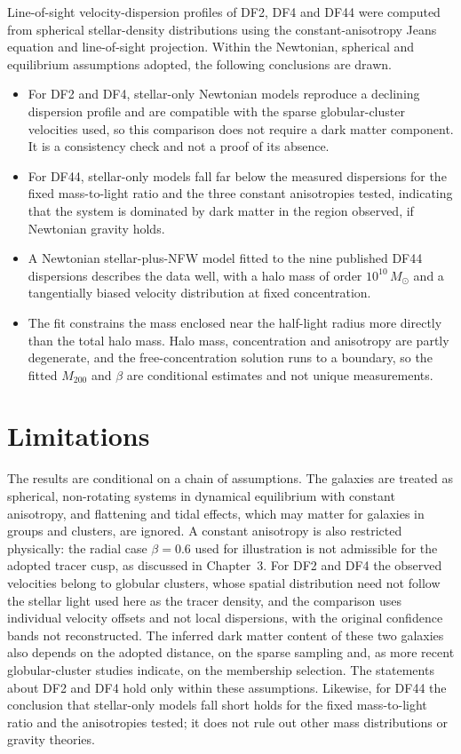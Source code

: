 \documentclass[12pt,a4paper]{report}
\numberwithin{equation}{chapter}
\begin{document}
Line-of-sight velocity-dispersion profiles of DF2, DF4 and DF44 were computed from spherical stellar-density distributions using the constant-anisotropy Jeans equation and line-of-sight projection. Within the Newtonian, spherical and equilibrium assumptions adopted, the following conclusions are drawn.
\begin{itemize}[leftmargin=1.5em,itemsep=2pt]
 \item For DF2 and DF4, stellar-only Newtonian models reproduce a declining dispersion profile and are compatible with the sparse globular-cluster velocities used, so this comparison does not require a dark matter component. It is a consistency check and not a proof of its absence.
 \item For DF44, stellar-only models fall far below the measured dispersions for the fixed mass-to-light ratio and the three constant anisotropies tested, indicating that the system is dominated by dark matter in the region observed, if Newtonian gravity holds.
 \item A Newtonian stellar-plus-NFW model fitted to the nine published DF44 dispersions describes the data well, with a halo mass of order $10^{10}\,M_\odot$ and a tangentially biased velocity distribution at fixed concentration.
 \item The fit constrains the mass enclosed near the half-light radius more directly than the total halo mass. Halo mass, concentration and anisotropy are partly degenerate, and the free-concentration solution runs to a boundary, so the fitted $M_{200}$ and $\beta$ are conditional estimates and not unique measurements.
\end{itemize}

\section{Limitations}

The results are conditional on a chain of assumptions. The galaxies are treated as spherical, non-rotating systems in dynamical equilibrium with constant anisotropy, and flattening and tidal effects, which may matter for galaxies in groups and clusters, are ignored. A constant anisotropy is also restricted physically: the radial case $\beta=0.6$ used for illustration is not admissible for the adopted tracer cusp, as discussed in Chapter~3. For DF2 and DF4 the observed velocities belong to globular clusters, whose spatial distribution need not follow the stellar light used here as the tracer density, and the comparison uses individual velocity offsets and not local dispersions, with the original confidence bands not reconstructed. The inferred dark matter content of these two galaxies also depends on the adopted distance, on the sparse sampling and, as more recent globular-cluster studies indicate, on the membership selection. The statements about DF2 and DF4 hold only within these assumptions. Likewise, for DF44 the conclusion that stellar-only models fall short holds for the fixed mass-to-light ratio and the anisotropies tested; it does not rule out other mass distributions or gravity theories.
\end{document}
